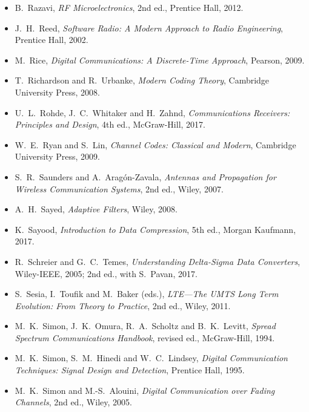 \begin{itemize}[leftmargin=1.5em,itemindent=-1.5em,itemsep=1.5pt plus 1pt,parsep=0pt,topsep=4pt,label={}]
\item B.~Razavi, \emph{RF Microelectronics}, 2nd ed., Prentice Hall, 2012.
\item J.~H.~Reed, \emph{Software Radio: A Modern Approach to Radio Engineering}, Prentice Hall, 2002.
\item M.~Rice, \emph{Digital Communications: A Discrete-Time Approach}, Pearson, 2009.
\item T.~Richardson and R.~Urbanke, \emph{Modern Coding Theory}, Cambridge University Press, 2008.
\item U.~L.~Rohde, J.~C.~Whitaker and H.~Zahnd, \emph{Communications Receivers: Principles and Design}, 4th ed., McGraw-Hill, 2017.
\item W.~E.~Ryan and S.~Lin, \emph{Channel Codes: Classical and Modern}, Cambridge University Press, 2009.
\item S.~R.~Saunders and A.~Arag\'on-Zavala, \emph{Antennas and Propagation for Wireless Communication Systems}, 2nd ed., Wiley, 2007.
\item A.~H.~Sayed, \emph{Adaptive Filters}, Wiley, 2008.
\item K.~Sayood, \emph{Introduction to Data Compression}, 5th ed., Morgan Kaufmann, 2017.
\item R.~Schreier and G.~C.~Temes, \emph{Understanding Delta-Sigma Data Converters}, Wiley-IEEE, 2005; 2nd ed., with S.~Pavan, 2017.
\item S.~Sesia, I.~Toufik and M.~Baker (eds.), \emph{LTE---The UMTS Long Term Evolution: From Theory to Practice}, 2nd ed., Wiley, 2011.
\item M.~K.~Simon, J.~K.~Omura, R.~A.~Scholtz and B.~K.~Levitt, \emph{Spread Spectrum Communications Handbook}, revised ed., McGraw-Hill, 1994.
\item M.~K.~Simon, S.~M.~Hinedi and W.~C.~Lindsey, \emph{Digital Communication Techniques: Signal Design and Detection}, Prentice Hall, 1995.
\item M.~K.~Simon and M.-S.~Alouini, \emph{Digital Communication over Fading Channels}, 2nd ed., Wiley, 2005.

\end{itemize}

